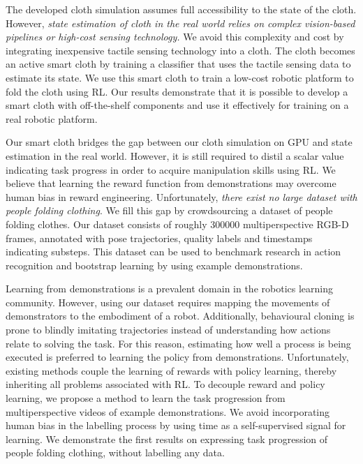 \documentclass[\home/main.tex]{subfiles}
\begin{document}
The developed cloth simulation assumes full accessibility to the state of the cloth. However, \emph{state estimation of cloth in the real world relies on complex vision-based pipelines or high-cost sensing technology.} We avoid this complexity and cost by integrating inexpensive tactile sensing technology into a cloth. The cloth becomes an active smart cloth by training a classifier that uses the tactile sensing data to estimate its state. We use this smart cloth to train a low-cost robotic platform to fold the cloth using \gls{RL}. Our results demonstrate that it is possible to develop a smart cloth with off-the-shelf components and use it effectively for training on a real robotic platform. 

Our smart cloth bridges the gap between our cloth simulation on GPU and state estimation in the real world.
However, it is still required to distil a scalar value indicating task progress in order to acquire manipulation skills using \gls{RL}. We believe that learning the reward function from demonstrations may overcome human bias in reward engineering. Unfortunately, \emph{there exist no large dataset with people folding clothing}. We fill this gap by crowdsourcing a dataset of people folding clothes. Our dataset consists of roughly \qty{300000}{} multiperspective RGB-D frames, annotated with pose trajectories, quality labels and timestamps indicating substeps. This dataset can be used to benchmark research in action recognition and bootstrap learning by using example demonstrations. 

Learning from demonstrations is a prevalent domain in the robotics learning community. However, using our dataset requires mapping the movements of demonstrators to the embodiment of a robot. Additionally, behavioural cloning is prone to blindly imitating trajectories instead of understanding how actions relate to solving the task. For this reason, estimating how well a process is being executed is preferred to learning the policy from demonstrations. Unfortunately, existing methods couple the learning of rewards with policy learning, thereby inheriting all problems associated with \gls{RL}.  
To decouple reward and policy learning, we propose a method to learn the task progression from multiperspective videos of example demonstrations. We avoid incorporating human bias in the labelling process by using time as a self-supervised signal for learning. We demonstrate the first results on expressing task progression of people folding clothing, without labelling any data. 
\end{document}
